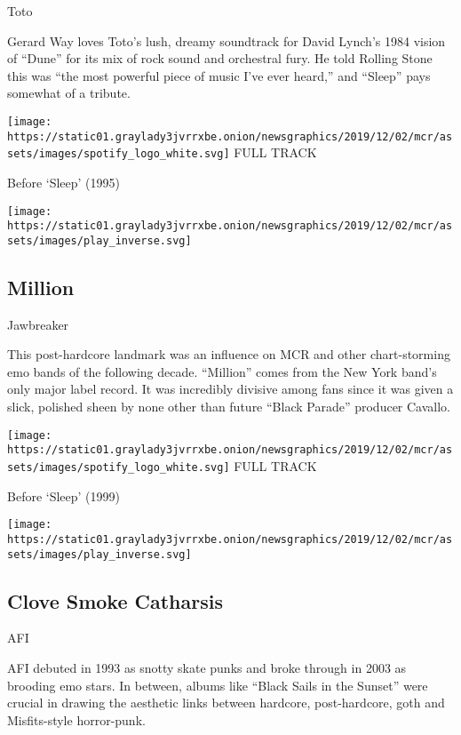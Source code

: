 Toto

Gerard Way loves Toto's lush, dreamy soundtrack for David Lynch's 1984
vision of ``Dune'' for its mix of rock sound and orchestral fury. He
told Rolling Stone this was ``the most powerful piece of music I've ever
heard,'' and ``Sleep'' pays somewhat of a tribute.

\href{https://open.spotify.com/track/7HQiwzEofWBjL2V1WLbi1H?si=uMw7huS8TEGvbbeI6qaCvA}{}

\texttt{[image: https://static01.graylady3jvrrxbe.onion/newsgraphics/2019/12/02/mcr/assets/images/spotify\_logo\_white.svg]}
FULL TRACK

Before `Sleep' (1995)

\texttt{[image: https://static01.graylady3jvrrxbe.onion/newsgraphics/2019/12/02/mcr/assets/images/play\_inverse.svg]}

\hypertarget{million}{%
\subsection{Million}\label{million}}

Jawbreaker

This post-hardcore landmark was an influence on MCR and other
chart-storming emo bands of the following decade. ``Million'' comes from
the New York band's only major label record. It was incredibly divisive
among fans since it was given a slick, polished sheen by none other than
future ``Black Parade'' producer Cavallo.

\href{https://open.spotify.com/track/2w8vfaGE551NZ7WoWMN6Ap?si=IrgqZJ4RR0O_Xe8hNQ9nug}{}

\texttt{[image: https://static01.graylady3jvrrxbe.onion/newsgraphics/2019/12/02/mcr/assets/images/spotify\_logo\_white.svg]}
FULL TRACK

Before `Sleep' (1999)

\texttt{[image: https://static01.graylady3jvrrxbe.onion/newsgraphics/2019/12/02/mcr/assets/images/play\_inverse.svg]}

\hypertarget{clove-smoke-catharsis}{%
\subsection{Clove Smoke Catharsis}\label{clove-smoke-catharsis}}

AFI

AFI debuted in 1993 as snotty skate punks and broke through in 2003 as
brooding emo stars. In between, albums like ``Black Sails in the
Sunset'' were crucial in drawing the aesthetic links between hardcore,
post-hardcore, goth and Misfits-style horror-punk.

